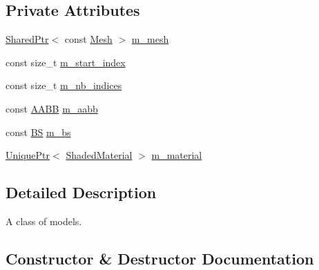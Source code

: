 \subsection*{Private Attributes}
\begin{DoxyCompactItemize}
\item 
\hyperlink{namespacemage_a1e01ae66713838a7a67d30e44c67703e}{Shared\+Ptr}$<$ const \hyperlink{classmage_1_1_mesh}{Mesh} $>$ \hyperlink{classmage_1_1_model_aecd2b4031c5df30fb5f7ed6d62810f73}{m\+\_\+mesh}
\item 
const size\+\_\+t \hyperlink{classmage_1_1_model_a63a3e697c9eb1606249de15cc7b818c3}{m\+\_\+start\+\_\+index}
\item 
const size\+\_\+t \hyperlink{classmage_1_1_model_a1fcf80ed9f3002bd2319ef83f073ae75}{m\+\_\+nb\+\_\+indices}
\item 
const \hyperlink{structmage_1_1_a_a_b_b}{A\+A\+BB} \hyperlink{classmage_1_1_model_ab53a0f253df545fd59723bee107bf523}{m\+\_\+aabb}
\item 
const \hyperlink{structmage_1_1_b_s}{BS} \hyperlink{classmage_1_1_model_a1d3ea0a9f302f623dcaceb2df4315a0b}{m\+\_\+bs}
\item 
\hyperlink{namespacemage_a8c307fbcc33bce9b7f2aa4c26c3b95cf}{Unique\+Ptr}$<$ \hyperlink{structmage_1_1_shaded_material}{Shaded\+Material} $>$ \hyperlink{classmage_1_1_model_a93e080e5dc2c7c0672a278de76899122}{m\+\_\+material}
\end{DoxyCompactItemize}


\subsection{Detailed Description}
A class of models. 

\subsection{Constructor \& Destructor Documentation}
\hypertarget{classmage_1_1_model_add9b05c4ca824c116f4ac0759eb62ef7}{}\label{classmage_1_1_model_add9b05c4ca824c116f4ac0759eb62ef7} 
